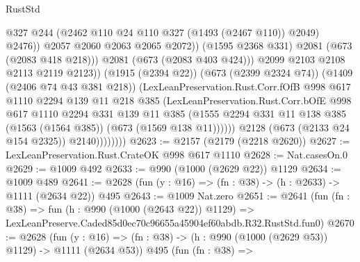 \begin{lexlean}{RustStd}
\begin{coremodule}
                                      @327
                                      @244
                                      (@2462 @110 @24 @110 @327 (@1493 (@2467 @110)) @2049)
                                      @2476))
                                  @2057
                                  @2060
                                  @2063
                                  @2065
                                  @2072))
                              (@1595 @2368 @331)
                              @2081
                              (@673 (@2083 @418 @218)))
                            @2081
                            (@673 (@2083 @403 @424)))
                          @2099
                          @2103
                          @2108
                          @2113
                          @2119
                          @2123))
                      (@1915 (@2394 @22))
                      (@673 (@2399 @2324 @74))
                      (@1409 (@2406 @74 @43 @381 @218))
                      (LexLeanPreservation.Rust.Corr.fOfB
                        @998
                        @617
                        @1110
                        @2294
                        @139
                        @11
                        @218
                        @385
                        (LexLeanPreservation.Rust.Corr.bOfE
                          @998
                          @617
                          @1110
                          @2294
                          @331
                          @139
                          @11
                          @385
                          (@1555
                            @2294
                            @331
                            @11
                            @138
                            @385
                            (@1563 (@1564 @385))
                            (@673 (@1569 @138 @11))))))
                    @2128
                    (@673 (@2133 @24 @154 @2325))
                    @2140))))))))
@2623 := @2157 (@2179 (@2218 @2620))
@2627 := LexLeanPreservation.Rust.CrateOK @998 @617 @1110
@2628 := Nat.casesOn.{0}
@2629 := @1009 @492
@2633 := @990 (@1000 (@2629 @22)) @1129
@2634 := @1009 @489
@2641 := @2628 (fun (y : @16) => (fn : @38) -> (h : @2633) -> @1111 (@2634 @22)) @495
@2643 := @1009 Nat.zero
@2651 := @2641
    (fun (fn : @38) =>
    fun (h : @990 (@1000 (@2643 @22)) @1129) =>
    LexLeanPreserve.Caded85d0ec70c96655a45904ef60abdb.R32.RustStd.fun0)
@2670 := @2628
    (fun (y : @16) => (fn : @38) -> (h : @990 (@1000 (@2629 @53)) @1129) -> @1111 (@2634 @53))
    @495
    (fun (fn : @38) =>

\end{coremodule}
\end{lexlean}
